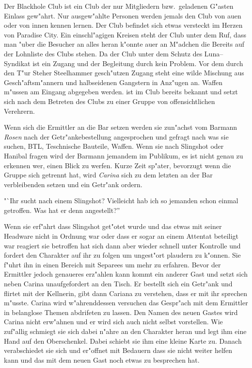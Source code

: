 
Der Blackhole Club ist ein Club der nur Mitgliedern bzw.~geladenen G"asten Einlass gew"ahrt. Nur ausgew"ahlte Personen werden jemals den Club von au\3en oder von innen kennen lernen. Der Club befindet sich etwas versteckt im Herzen von Paradise City. Ein einschl"agigen Kreisen steht der Club unter dem Ruf, dass man "uber die Besucher an alles heran k"onnte au\3er an M"adchen die Bereits auf der Lohnliste des Clubs stehen. Da der Club unter dem Schutz des Luna--Syndikat ist ein Zugang und der Begleitung durch \xl{} kein Problem. Vor dem durch den T"ur Steher Steelhammer gesch"utzen Zugang steht eine wilde Mischung aus Gesch"aftsm"annern und halbseidenen Gangstern in Anz"ugen an. Waffen m"ussen am Eingang abgegeben werden. \xl{} ist im Club bereits bekannt und setzt sich nach dem Betreten des Clubs zu einer Gruppe von offensichtlichen Verehrern.

Wenn sich die Ermittler an die Bar setzen werden sie zun"achst vom Barmann \emph{Rosen} nach der Getr"ankebestellung angesprochen und gefragt nach was sie suchen, BTL, Teschnische Bauteile, Waffen. Wenn sie nach Slingshot oder Hanibal fragen wird der Barmann jemandem im Publikum, es ist nicht genau zu erkennen wer, einen Blick zu werfen. Kurze Zeit sp"ater, bevorzugt wenn die Gruppe sich getrennt hat, wird \emph{Carina} sich zu dem letzten an der Bar verbleibenden setzen und ein Getr"ank ordern.

"`Ihr sucht nach einem Slingshot? Vielleicht hab ich so jemanden schon einmal getroffen. Was hat er denn angestellt?''

Wenn sie erf"ahrt dass Slingshot get"otet wurde und das etwas mit seiner Headware nicht in Ordnung war oder dass er sogar an einem Attentat beteiligt war reagiert sie betroffen hat sich dann aber wieder schnell unter Kontrolle und fordert den Charakter auf ihr zu folgen um ungest"ort plaudern zu k"onnen. Sie f"uhrt ihn in einen Bereich mit Separees um mehr zu erfahren. Bevor der Ermittler jedoch genaueres erz"ahlen kann kommt ein anderer Gast und setzt sich neben Carina unaufgefordert an den Tisch. Er bestellt sich ein Getr"ank und flirtet mit der Kellnerin, gibt dann Cariana zu verstehen, dass er mit ihr sprechen m"usste. Carina wird w"ahrenddessen versuchen das Gespr"ach mit dem Ermittler in belanglose Themen abdrifeten zu lassen. Den Namen des neuen Gastes wird Carina nicht erw"ahnen und er wird sich auch nicht selbst vorstellen. Wie zuf"allig schmiegt sie sich dabei n"ahre an den Charakter heran und legt ihm eine Hand auf den Oberschenkel. Dabei schiebt sie ihm eine kleine Karte zu. Danach verabschiedet sie sich und er"offnet mit Bedauern dass sie nicht weiter helfen kann und das mit dem neuen Gast noch etwas zu besprechen hat.

